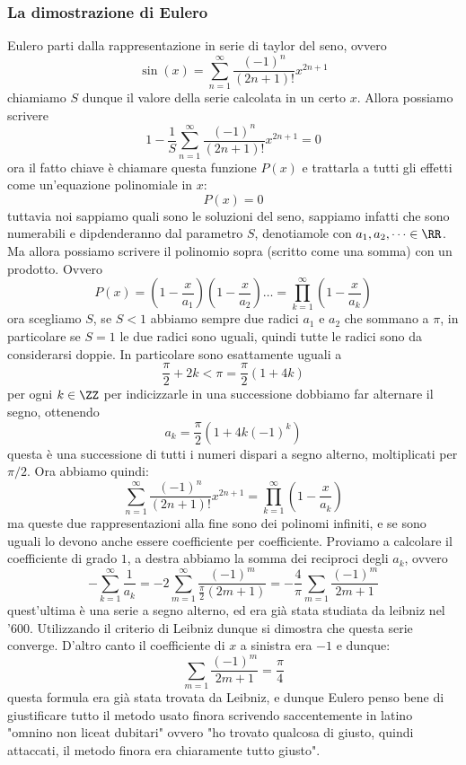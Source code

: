 \documentclass[11pt]{scrartcl}
\begin{document}
  \subsubsection{La dimostrazione di Eulero}
  Eulero parti dalla rappresentazione in serie di taylor del seno, ovvero
  $$\sin (x)=\sum_{n=1}^\infty \frac{(-1)^n}{(2n+1)!}x^{2n+1}$$
  chiamiamo $S$ dunque il valore della serie calcolata in un certo $x$. Allora possiamo scrivere
  $$1-\frac{1}{S}\sum_{n=1}^\infty \frac{(-1)^n}{(2n+1)!}x^{2n+1}=0$$
  ora il fatto chiave è chiamare questa funzione $P(x)$ e trattarla a tutti gli effetti come un'equazione polinomiale in $x$:
  $$P(x)=0$$
  tuttavia noi sappiamo quali sono le soluzioni del seno, sappiamo infatti che sono numerabili e dipdenderanno dal parametro $S$, denotiamole con $a_1,a_2,\dots \in \RR$. Ma allora possiamo scrivere il polinomio sopra (scritto come una somma) con un prodotto. Ovvero
  $$P(x)=\left(1-\frac{x}{a_1}\right)\left(1-\frac{x}{a_2}\right)\dots=\prod_{k=1}^\infty \left(1-\frac{x}{a_k}\right)$$
  ora scegliamo $S$, se $S<1$ abbiamo sempre due radici $a_1$ e $a_2$ che sommano a $\pi$, in particolare se $S=1$ le due radici sono uguali, quindi tutte le radici sono da considerarsi doppie. In particolare sono esattamente uguali a
  $$\frac{\pi}{2}+2k<\pi=\frac{\pi}{2}(1+4k)$$ 
  per ogni $k\in\ZZ$ per indicizzarle in una successione dobbiamo far alternare il segno, ottenendo
  $$a_k=\frac{\pi}{2}(1+4k(-1)^k)$$
  questa è una successione di tutti i numeri dispari a segno alterno, moltiplicati per $\pi/2$. Ora abbiamo quindi:
  $$\sum_{n=1}^\infty \frac{(-1)^n}{(2n+1)!}x^{2n+1}=\prod_{k=1}^\infty \left(1-\frac{x}{a_k}\right)$$
  ma queste due rappresentazioni alla fine sono dei polinomi infiniti, e se sono uguali lo devono anche essere coefficiente per coefficiente. Proviamo a calcolare il coefficiente di grado $1$, a destra abbiamo la somma dei reciproci degli $a_k$, ovvero
  $$-\sum_{k=1}^\infty\frac{1}{a_k}=-2\sum_{m=1}^\infty \frac{(-1)^m}{\frac{\pi}{2}(2m+1)}=-\frac{4}{\pi}\sum_{m=1}\frac{(-1)^m}{2m+1}$$
  quest'ultima è una serie a segno alterno, ed era già stata studiata da leibniz nel '600. Utilizzando il criterio di Leibniz dunque si dimostra che questa serie converge. D'altro canto il coefficiente di $x$ a sinistra era $-1$ e dunque:
  $$\sum_{m=1}\frac{(-1)^m}{2m+1}=\frac{\pi}{4}$$
  questa formula era già stata trovata da Leibniz, e dunque Eulero penso bene di giustificare tutto il metodo usato finora scrivendo saccentemente in latino "omnino non liceat dubitari" ovvero "ho trovato qualcosa di giusto, quindi attaccati, il metodo finora era chiaramente tutto giusto".\\
\end{document}
